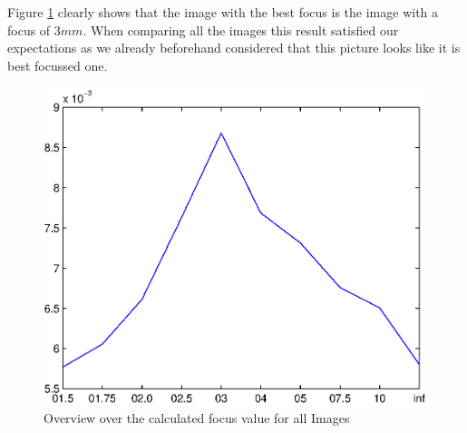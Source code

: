 \documentclass[
a4paper,     %
12pt         %
]{scrartcl}  %
\begin{document}
Figure \ref{fig:autofocus_hist} clearly shows that the image with the best focus is the image with a focus of $3mm$.
When comparing all the images this result satisfied our expectations as we already beforehand considered that this picture looks like it is best focussed one.

\begin{figure}[ht!]
 \centering
 \includegraphics{./Bildg_Messtechnik_Lab/Autofokus/html/main_01.eps}
 \caption{Overview over the calculated focus value for all Images}
 \label{fig:autofocus_hist}
\end{figure}
\end{document}
